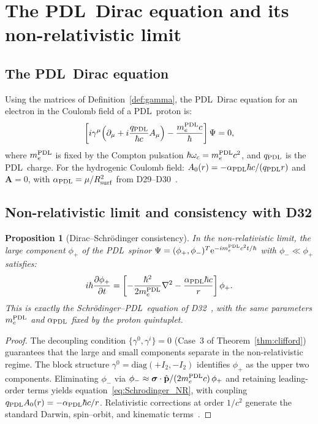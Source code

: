 \documentclass[11pt,a4paper]{article}
\newtheorem{proposition}[theorem]{Proposition}
\theoremstyle{definition}
\newcommand{\PDL}{\textnormal{PDL}}
\newcommand{\Rsurf}{R_{\mathrm{surf}}}
\newcommand{\hb}{\hbar}
\newcommand{\aPDL}{\alpha_{\PDL}}
\newcommand{\mePDL}{m_e^{\PDL}}
\begin{document}
\section{The \PDL\ Dirac equation and its non-relativistic limit}
\label{sec:NR}

\subsection{The \PDL\ Dirac equation}

Using the matrices of Definition~\ref{def:gamma}, the \PDL\ Dirac equation for an electron in the Coulomb field of a \PDL\ proton is:
\begin{equation}
\left[i\gamma^\mu\!\left(\partial_\mu + i\frac{q_{\PDL}}{\hb c} A_\mu\right) - \frac{\mePDL c}{\hb}\right]\Psi = 0,
\label{eq:Dirac_PDL}
\end{equation}
where $\mePDL$ is fixed by the Compton pulsation $\hb\omega_c = \mePDL c^2$, and $q_{\PDL}$ is the \PDL\ charge. For the hydrogenic Coulomb field: $A_0(r) = -\aPDL \hb c/(q_{\PDL} r)$ and $\mathbf{A} = 0$, with $\aPDL = \mu/\Rsurf^2$ from D29--D30~\cite{PDL_D29_2026,PDL_D30_2026}.

\subsection{Non-relativistic limit and consistency with D32}

\begin{proposition}[Dirac--Schr\"odinger consistency]
\label{prop:NR_limit}
In the non-relativistic limit, the large component $\phi_+$ of the \PDL\ spinor $\Psi = (\phi_+, \phi_-)^T \mathrm{e}^{-i\mePDL c^2 t/\hb}$ with $\phi_- \ll \phi_+$ satisfies:
\begin{equation}
i\hb \frac{\partial \phi_+}{\partial t} = \left[-\frac{\hb^2}{2\mePDL}\nabla^2 - \frac{\aPDL \hb c}{r}\right]\phi_+.
\label{eq:Schrodinger_NR}
\end{equation}
This is exactly the Schr\"odinger--\PDL\ equation of D32~\cite{PDL_D32_2026}, with the same parameters $\mePDL$ and $\aPDL$ fixed by the proton quintuplet.
\end{proposition}

\begin{proof}
The decoupling condition $\{\gamma^0, \gamma^i\} = 0$ (Case~3 of Theorem~\ref{thm:clifford}) guarantees that the large and small components separate in the non-relativistic regime. The block structure $\gamma^0 = \mathrm{diag}(+I_2, -I_2)$ identifies $\phi_+$ as the upper two components. Eliminating $\phi_-$ via $\phi_- \approx \boldsymbol{\sigma}\cdot\hat{\mathbf{p}}/(2\mePDL c)\,\phi_+$ and retaining leading-order terms yields equation~\eqref{eq:Schrodinger_NR}, with coupling $q_{\PDL} A_0(r) = -\aPDL \hb c/r$. Relativistic corrections at order $1/c^2$ generate the standard Darwin, spin--orbit, and kinematic terms~\cite{Bjorken_Drell}.
\end{proof}
\end{document}
